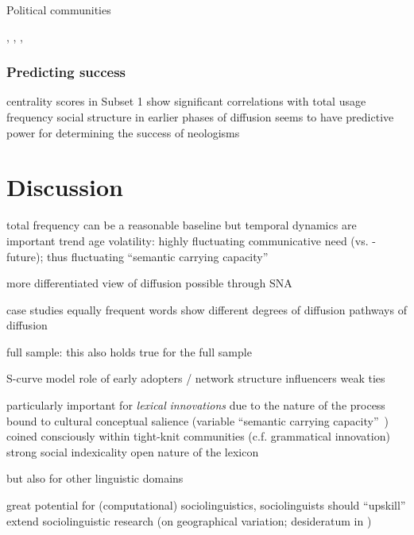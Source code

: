 \documentclass[
  a4paper,
  abstract=on,
  captions=tableabove
  ]{scrartcl}
\begin{document}
    Political communities

      , , , 
      
    \subsubsection{Predicting success} 

      centrality scores in Subset 1 show significant correlations with total usage frequency
      social structure in earlier phases of diffusion seems to have predictive power for determining the success of neologisms
    

\section{Discussion}
  \label{sec:discussion}

    total frequency can be a reasonable baseline
      but temporal dynamics are important
        trend
        age
        volatility: highly fluctuating communicative need (vs. -future); thus fluctuating \enquote{semantic carrying capacity}~\parencite{Grieve2018MappingLexical} 
    
    more differentiated view of diffusion possible through SNA
    
      case studies
        equally frequent words show different
          degrees of diffusion
          pathways of diffusion

      full sample: this also holds true for the full sample

      S-curve model
        role of early adopters / network structure
        influencers
        weak ties

    particularly important for \emph{lexical} \emph{innovations} due to the nature of the process
        bound to cultural conceptual salience (variable \enquote{semantic carrying capacity}~\parencite{Nini2017ApplicationGrowth})
        coined consciously within tight-knit communities (c.f. grammatical innovation)
        strong social indexicality
        open nature of the lexicon

    but also for other linguistic domains

    great potential for (computational) sociolinguistics, sociolinguists should \enquote{upskill}
      extend sociolinguistic research (on geographical variation; desideratum in \cite{Grieve2019MappingLexical})


\end{document}
